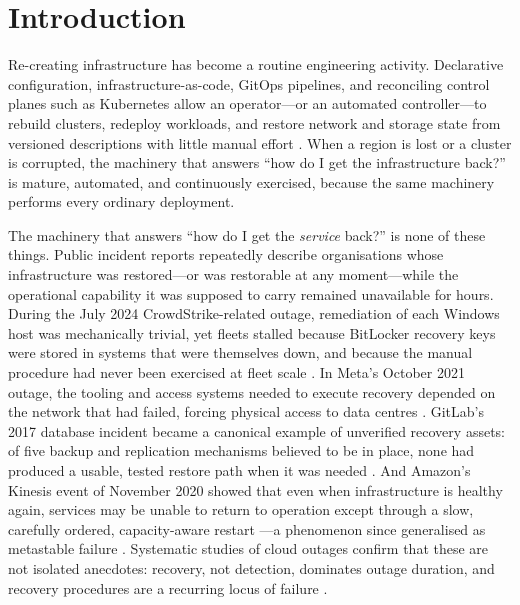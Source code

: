 \section{Introduction}
\label{sec:intro}

Re-creating infrastructure has become a routine engineering activity. Declarative configuration, infrastructure-as-code, GitOps pipelines, and reconciling control planes such as Kubernetes allow an operator---or an automated controller---to rebuild clusters, redeploy workloads, and restore network and storage state from versioned descriptions with little manual effort \citep{burns2016borg,morris2020iac,argocd}. When a region is lost or a cluster is corrupted, the machinery that answers ``how do I get the infrastructure back?'' is mature, automated, and continuously exercised, because the same machinery performs every ordinary deployment.

The machinery that answers ``how do I get the \emph{service} back?'' is none of these things. Public incident reports repeatedly describe organisations whose infrastructure was restored---or was restorable at any moment---while the operational capability it was supposed to carry remained unavailable for hours. During the July 2024 CrowdStrike-related outage, remediation of each Windows host was mechanically trivial, yet fleets stalled because BitLocker recovery keys were stored in systems that were themselves down, and because the manual procedure had never been exercised at fleet scale \citep{crowdstrike2024rca,microsoft2024kb}. In Meta's October 2021 outage, the tooling and access systems needed to execute recovery depended on the network that had failed, forcing physical access to data centres \citep{meta2021outage}. GitLab's 2017 database incident became a canonical example of unverified recovery assets: of five backup and replication mechanisms believed to be in place, none had produced a usable, tested restore path when it was needed \citep{gitlab2017postmortem}. And Amazon's Kinesis event of November 2020 showed that even when infrastructure is healthy again, services may be unable to return to operation except through a slow, carefully ordered, capacity-aware restart \citep{aws2020kinesis}---a phenomenon since generalised as metastable failure \citep{bronson2021metastable,huang2022metastable}. Systematic studies of cloud outages confirm that these are not isolated anecdotes: recovery, not detection, dominates outage duration, and recovery procedures are a recurring locus of failure \citep{gunawi2016cloud,ghosh2022fight,uptime2024outage}.

